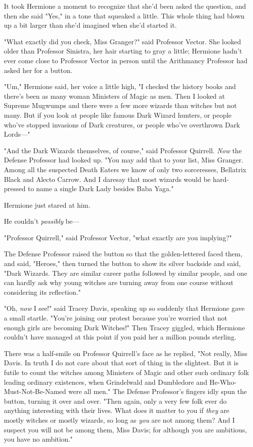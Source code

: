 It took Hermione a moment to recognize that she'd been asked the question, and 
then she said "Yes," in a tone that squeaked a little. This whole thing had 
blown up a bit larger than she'd imagined when she'd started it.

"What exactly did you check, Miss Granger?" said Professor Vector. She looked 
older than Professor Sinistra, her hair starting to gray a little; Hermione 
hadn't ever come close to Professor Vector in person until the Arithmancy 
Professor had asked her for a button.

"Um," Hermione said, her voice a little high, "I checked the history books and 
there's been as many woman Ministers of Magic as men. Then I looked at Supreme 
Mugwumps and there were a few more wizards than witches but not many. But if 
you look at people like famous Dark Wizard hunters, or people who've stopped 
invasions of Dark creatures, or people who've overthrown Dark Lords---"

"And the Dark Wizards themselves, of course," said Professor Quirrell. 
\emph{Now} the Defense Professor had looked up. "You may add that to your list, 
Miss Granger. Among all the suspected Death Eaters we know of only two 
sorceresses, Bellatrix Black and Alecto Carrow. And I daresay that most wizards 
would be hard-pressed to name a single Dark Lady besides Baba Yaga."

Hermione just stared at him.

He couldn't \emph{possibly} be---

"Professor Quirrell," said Professor Vector, "what exactly are you implying?"

The Defense Professor raised the button so that the golden-lettered \SPHEW 
faced them, and said, "Heroes," then turned the button to show its silver 
backside and said, "Dark Wizards. They are similar career paths followed by 
similar people, and one can hardly ask why young witches are turning away from 
one course without considering its reflection."

"Oh, \emph{now} I see!" said Tracey Davis, speaking up so suddenly that 
Hermione gave a small startle. "You're joining our protest because you're 
worried that not enough girls are becoming Dark Witches!" Then Tracey giggled, 
which Hermione couldn't have managed at this point if you paid her a million 
pounds sterling.

There was a half-smile on Professor Quirrell's face as he replied, "Not really, 
Miss Davis. In truth I do not care about that sort of thing in the slightest. 
But it is futile to count the witches among Ministers of Magic and other such 
ordinary folk leading ordinary existences, when Grindelwald and Dumbledore and 
He-Who-Must-Not-Be-Named were all men." The Defense Professor's fingers idly 
spun the button, turning it over and over. "Then again, only a very few folk 
ever do anything interesting with their lives. What does it matter to you if 
\emph{they} are mostly witches or mostly wizards, so long as \emph{you} are not 
among them? And I suspect you will not be among them, Miss Davis; for although 
you are ambitious, you have no ambition."

